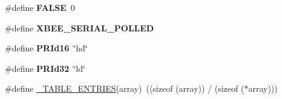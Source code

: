 \begin{DoxyCompactItemize}
\item 
\hypertarget{group__hal_gaa93f0eb578d23995850d61f7d61c55c1}{\#define {\bfseries F\-A\-L\-S\-E}~0}\label{group__hal_gaa93f0eb578d23995850d61f7d61c55c1}

\item 
\hypertarget{group__hal_ga9bc39fa696de31976b60b54c9b8e62aa}{\#define {\bfseries X\-B\-E\-E\-\_\-\-S\-E\-R\-I\-A\-L\-\_\-\-P\-O\-L\-L\-E\-D}}\label{group__hal_ga9bc39fa696de31976b60b54c9b8e62aa}

\item 
\hypertarget{group__hal_ga087e50fe0283aacc71d7138d13e91939}{\#define {\bfseries P\-R\-Id16}~\char`\"{}hd\char`\"{}}\label{group__hal_ga087e50fe0283aacc71d7138d13e91939}

\item 
\hypertarget{group__hal_ga6d94d1417e1b35c53aee6306590de72b}{\#define {\bfseries P\-R\-Id32}~\char`\"{}ld\char`\"{}}\label{group__hal_ga6d94d1417e1b35c53aee6306590de72b}

\item 
\hypertarget{group__hal_ga2fb602f8a5b3533a57c2c4b92f248569}{\#define \hyperlink{group__hal_ga2fb602f8a5b3533a57c2c4b92f248569}{\-\_\-\-T\-A\-B\-L\-E\-\_\-\-E\-N\-T\-R\-I\-E\-S}(array)~((sizeof (array)) / (sizeof ($\ast$array)))}\label{group__hal_ga2fb602f8a5b3533a57c2c4b92f248569}


\end{DoxyCompactItemize}
